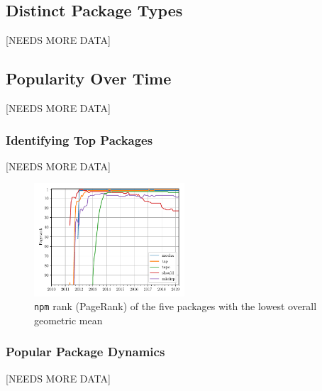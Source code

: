 \documentclass[10pt,conference]{IEEEtran}
\def\code#1{\texttt{#1}}
\begin{document}
\subsection{Distinct Package Types}
[NEEDS MORE DATA]

\subsection{Popularity Over Time}
[NEEDS MORE DATA]

\subsubsection{Identifying Top Packages}
[NEEDS MORE DATA]

\begin{figure}
  \includegraphics[width=0.5\textwidth]{figures/geo_mean_highest_pagerank.pdf}
  \caption{\code{npm} rank (PageRank) of the five packages with the lowest overall geometric mean}
  \label{topFive}
\end{figure}


\subsubsection{Popular Package Dynamics}
[NEEDS MORE DATA]
\end{document}

